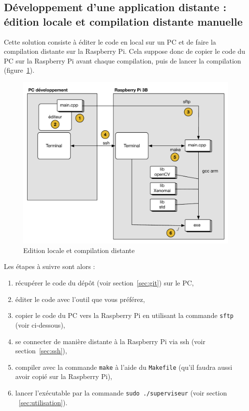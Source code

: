 \documentclass[11pt]{paper}
\newcommand{\raspi}{Raspberry Pi\xspace}
\begin{document}
\subsection{Développement d'une application distante : édition locale et compilation distante manuelle}

Cette solution consiste à éditer le code en local sur un PC et de faire la compilation distante sur la \raspi. Cela suppose donc de copier le code du PC sur la \raspi avant chaque compilation, puis de lancer la compilation (figure~\ref{fig:edition2}).

\begin{figure}[htbp]
\begin{center}
\includegraphics[scale=0.5]{./figures-pdf/edition2}
\caption{Edition locale et compilation distante}
\label{fig:edition2}
\end{center}
\end{figure}

Les étapes à suivre sont alors :
\begin{enumerate}
\item récupérer le code du dépôt (voir section~\ref{sec:git}) sur le PC,
 \item éditer le code avec l'outil que vous préférez,
 \item copier le code du PC vers la \raspi en utilisant la commande {\tt sftp} (voir ci-dessous),
\item se connecter de manière distante à la \raspi via ssh (voir section~\ref{sec:ssh}),
 \item compiler avec la commande {\tt make} à l'aide du {\tt Makefile} (qu'il faudra aussi avoir copié sur la \raspi),
 \item lancer l'exécutable par la commande {\tt sudo ./superviseur} (voir section ~\ref{sec:utilisation}).
 \end{enumerate}
\end{document}
